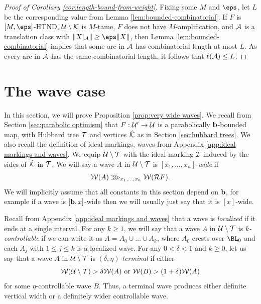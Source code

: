 \documentclass[12pt]{amsart}
\begin{document}
\begin{proof}[Proof of Corollary \ref{cor:length-bound-from-weight}]
	Fixing some $M$ and $\eps$, let $L$ be the corresponding value from Lemma \ref{lem:bounded-combinatorial}. If $F$ is $[M, \eps]$-HTND, $\UU\sm \KK$ is $M$-tame, $F$ does not have $M$-amplification, and $\AA$ is a translation class with $\|X|_\AA\|\geq  \eps\|X\|$, then Lemma \ref{lem:bounded-combinatorial} implies that some arc in $\AA$ has combinatorial length at most $L$. As every arc in $\AA$ has the same combinatorial length, it follows that $\ell(\AA)\leq L$.
\end{proof}



\section{The wave case}\label{sec:waves}

In this section, we will prove Proposition \ref{prop:very wide waves}.
We recall from Section \ref{sec:parabolic optimism} that $F: \UU'\to \UU$ is a parabolically $\bound$-bounded \pql map, with Hubbard tree $\TT$ and vertices $\hat\KK$ as in Section \ref{sec:hubbard trees}. 
We also recall the definition of ideal markings, waves from  Appendix \ref{app:ideal markings and waves}.
We equip $\UU\sm \TT$ with the ideal marking  $\II$  induced by the sides of $\hat\KK$ in $\TT$.
We will say a wave $A$ in $\UU\sm \TT$ is \textit{$[x_1, \dots, x_n]$-wide}  if $$\WW(A)\largergiven{x_1, \dots, x_n}\WW(\RR F).$$ 
We will implicitly assume that all constants in this section depend on $\bound$, for example if a wave is $[\bound, x]$-wide then we will usually just say that it is $[x]$-wide.

Recall from Appendix \ref{app:ideal markings and waves} that a wave is \emph{localized} if it ends at a single interval.
For any $k\geq 1$, we will say that a wave $A$ in $\UU\sm \TT$ is \emph{$k$-controllable}  if we can write it as
$A = A_0\cup \dots\cup A_k$, where $A_0$ crests over $\BL_0$ and each $A_j$ with $1\leq j \leq k$ is a localized wave. 
For any $0< \delta< 1$ and $k\geq 0$, let us say that a wave $A$ in $\UU\sm \TT$ is \textit{$(\delta, \eta)$-terminal}  if either  
$$\WW(\UU\sm \TT)> \delta\WW(A) \text{ or }\WW(B)> (1+\delta)\WW(A)$$ for some $\eta$-controllable wave $B$. 
{Thus, a terminal wave produces either definite vertical width or a definitely wider controllable wave.}  
\end{document}
